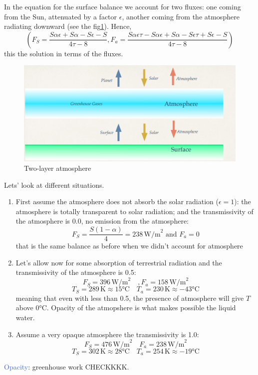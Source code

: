 In the equation for the surface balance we account for two fluxes: one coming from the Sun, attenuated by a factor $\epsilon$, another coming from the atmosphere radiating downward (see the fig\ref{fig:two layer}).
Hence,
\begin{equation}
	\left(F_S=\frac{S\alpha\epsilon+S\alpha-S\epsilon-S}{4\tau-8}, F_a=\frac{S\alpha\epsilon\tau-S\alpha\epsilon+S\alpha-S\epsilon\tau+S\epsilon-S}{4\tau-8}\right)
\end{equation}
this the solution in terms of the fluxes.
\begin{figure}[h!]
	\centering
	\includegraphics[width=0.5\linewidth]{uploads/Screenshot 2024-11-20 114831.png}
	\caption{Two-layer atmosphere}
	\label{fig:two layer}
\end{figure}
Lets’ look at different situations.
\begin{enumerate}
	\item First assume the atmosphere does not absorb the solar radiation ($\epsilon = 1$): the atmosphere is totally transparent to solar radiation; and the transmissivity of the atmosphere is 0.0, no emission from the atmosphere:
	      $$F_S=\frac{S(1-\alpha)}{4}=238 \,\text{W/m}^2 \,\,\text{and}\,\, F_a=0$$
	      that is the same balance as before when we didn't account for atmosphere
	\item Let’s allow now for some absorption of terrestrial radiation and the transmissivity of the atmosphere is 0.5:
	      $$F_S= 396 \,\text{W/m}^2 \quad, F_a=158 \, \text{W/m}^2$$
	      $$T_S= 289 \,\text{K}\approx 15°\text{C} \quad T_a=230 \, \text{K}\approx -43°\text{C}$$
	      meaning that even with less than 0.5, the presence of atmosphere will give $T$ above 0°C. Opacity of the atmopshere is what makes possible the liquid water.
	\item Assume a very opaque atmosphere the transmissivity is 1.0:
	      $$F_S=476 \,\text{W/m}^2 \quad F_a=238 \, \text{W/m}^2$$
	      $$T_S= 302 \,\text{K}\approx 28°\text{C} \quad T_a=254 \, \text{K}\approx -19°\text{C}$$
\end{enumerate}


\textcolor{RoyalBlue}{Opacity}: greenhouse work CHECKKKK.
